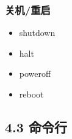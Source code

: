 \documentclass[xcolor=svgnames,bigger,presentation]{beamer}
\begin{document}
\begin{frame}
\frametitle{关机/重启}
\label{sec-4-2-17}
\begin{itemize}

\item shutdown
\label{sec-4-2-17-1}%

\item halt
\label{sec-4-2-17-2}%

\item poweroff
\label{sec-4-2-17-3}%

\item reboot
\label{sec-4-2-17-4}%
\end{itemize} %
\end{frame}
\subsection{4.3 命令行}
\label{sec-4-3}
\end{document}
